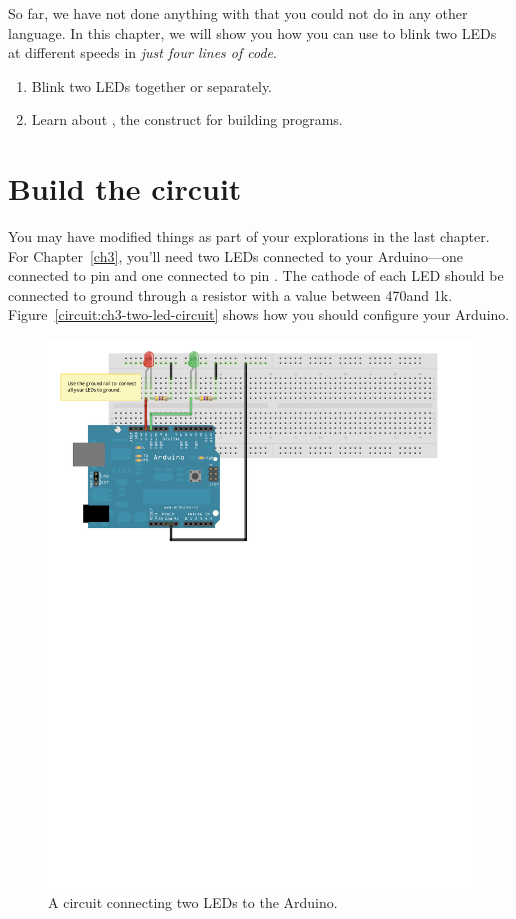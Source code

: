 So far, we have not done anything with \plumbing that you could not do in any other language. In this chapter, we will show you how you can use \plumbing to blink two LEDs at different speeds in {\em just four lines of code}. 

\GOALS
\begin{enumerate}
	\item Blink two LEDs together or separately.
	\item Learn about \PAR, the \occam construct for building \PARallel programs.
\end{enumerate}

\section{Build the circuit}
You may have modified things as part of your explorations in the last chapter. For Chapter~\ref{ch3}, you'll need two LEDs connected to your Arduino---one connected to pin \pineleven and one connected to pin \pintwelve. The cathode of each LED should be connected to ground through a resistor with a value between 470\ohm and 1k\ohm. Figure~\vref{circuit:ch3-two-led-circuit} shows how you should configure your Arduino.	

\begin{figure}[h]
  \begin{center}
    \includegraphics[width=0.8\linewidth]{images/ch3-two-led-circuit}
    \caption{A circuit connecting two LEDs to the Arduino.}
    \label{circuit:ch3-two-led-circuit}
  \end{center}
\end{figure}

